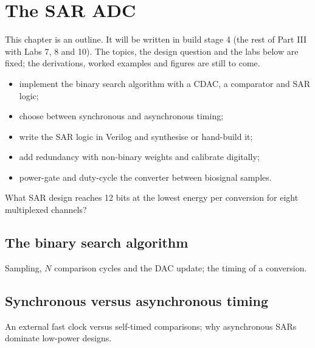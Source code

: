 \chapter{The SAR ADC}\label{ch:sar}

\begin{specnote}
This chapter is an outline. It will be written in build stage 4 (the rest of Part III with Labs 7, 8 and 10). The topics, the design question and the labs below are fixed; the derivations, worked examples and figures are still to come.
\end{specnote}

\begin{objectives}
\begin{itemize}
  \item implement the binary search algorithm with a CDAC, a comparator and SAR logic;
  \item choose between synchronous and asynchronous timing;
  \item write the SAR logic in Verilog and synthesise or hand-build it;
  \item add redundancy with non-binary weights and calibrate digitally;
  \item power-gate and duty-cycle the converter between biosignal samples.
\end{itemize}
\end{objectives}

\begin{insight}
What SAR design reaches 12 bits at the lowest energy per conversion for eight multiplexed channels?
\end{insight}

\section{The binary search algorithm}\label{sec:ch18-1}
Sampling, $N$ comparison cycles and the DAC update; the timing of a conversion.

\section{Synchronous versus asynchronous timing}\label{sec:ch18-2}
An external fast clock versus self-timed comparisons; why asynchronous SARs dominate low-power designs.

